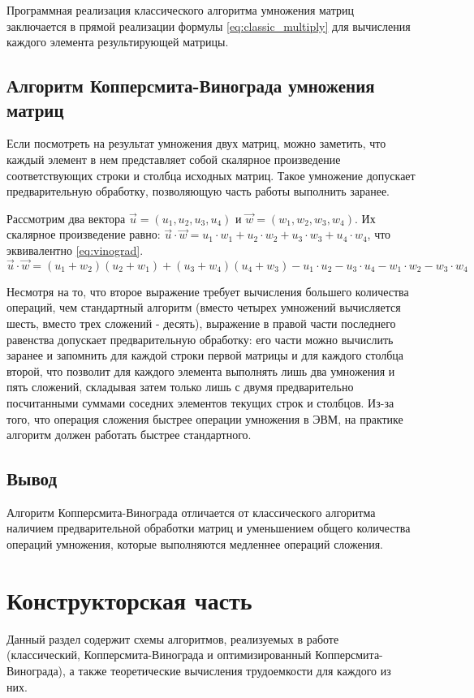 \documentclass[a4paper,oneside,14pt]{extreport}
\begin{document}
Программная реализация классического алгоритма умножения матриц заключается в прямой реализации формулы \ref{eq:classic_multiply} для вычисления каждого элемента результирующей матрицы.

\section{Алгоритм Копперсмита-Винограда умножения матриц}

Если посмотреть на результат умножения двух матриц, можно заметить, что каждый элемент в нем представляет собой скалярное произведение соответствующих строки и столбца исходных матриц.
Такое умножение допускает предварительную обработку, позволяющую часть работы выполнить заранее.

Рассмотрим два вектора $\vec{u} = (u_1, u_2, u_3, u_4)$ и $\vec{w} = (w_1, w_2, w_3, w_4)$.
Их скалярное произведение равно: $\vec{u} \cdot \vec{w} = u_1 \cdot w_1 + u_2 \cdot w_2 + u_3 \cdot w_3 + u_4 \cdot w_4$, что эквивалентно \ref{eq:vinograd}.
\begin{equation}
\label{eq:vinograd}
\vec{u} \cdot \vec{w} = (u_1 + w_2)(u_2 + w_1) + (u_3 + w_4)(u_4 + w_3) - u_1 \cdot u_2 - u_3 \cdot u_4 - w_1 \cdot w_2 - w_3 \cdot w_4
\end{equation}

Несмотря на то, что второе выражение требует вычисления большего количества операций, чем стандартный алгоритм (вместо четырех умножений вычисляется шесть, вместо трех сложений - десять), выражение в правой части последнего равенства допускает предварительную обработку: его части можно вычислить заранее и запомнить для каждой строки первой матрицы и для каждого столбца второй, что позволит для каждого элемента выполнять лишь два умножения и пять сложений, складывая затем только лишь с двумя предварительно посчитанными суммами соседних элементов текущих строк и столбцов.
Из-за того, что операция сложения быстрее операции умножения в ЭВМ, на практике алгоритм должен работать быстрее стандартного.

\section{Вывод}
Алгоритм Копперсмита-Винограда отличается от классического алгоритма наличием предварительной обработки матриц и уменьшением общего количества операций умножения, которые выполняются медленнее операций сложения.
\newpage
\chapter{Конструкторская часть}
Данный раздел содержит схемы алгоритмов, реализуемых в работе (классический, Копперсмита-Винограда и оптимизированный Копперсмита-Винограда), а также теоретические вычисления трудоемкости для каждого из них.
\end{document}

